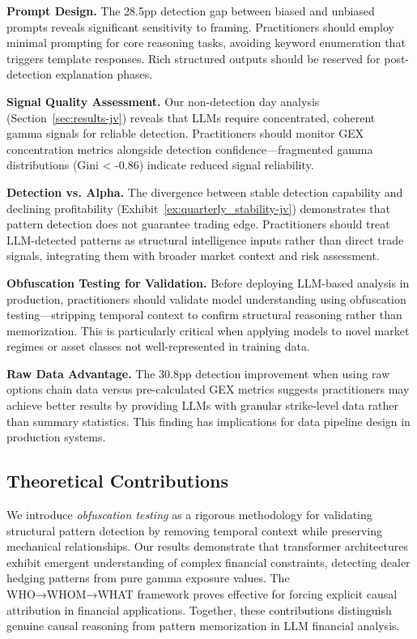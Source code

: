 \textbf{Prompt Design.} The 28.5pp detection gap between biased and unbiased prompts reveals significant sensitivity to framing. Practitioners should employ minimal prompting for core reasoning tasks, avoiding keyword enumeration that triggers template responses. Rich structured outputs should be reserved for post-detection explanation phases.

\textbf{Signal Quality Assessment.} Our non-detection day analysis (Section~\ref{sec:results-jv}) reveals that LLMs require concentrated, coherent gamma signals for reliable detection. Practitioners should monitor GEX concentration metrics alongside detection confidence—fragmented gamma distributions (Gini < -0.86) indicate reduced signal reliability.

\textbf{Detection vs. Alpha.} The divergence between stable detection capability and declining profitability (Exhibit~\ref{ex:quarterly_stability-jv}) demonstrates that pattern detection does not guarantee trading edge. Practitioners should treat LLM-detected patterns as structural intelligence inputs rather than direct trade signals, integrating them with broader market context and risk assessment.

\textbf{Obfuscation Testing for Validation.} Before deploying LLM-based analysis in production, practitioners should validate model understanding using obfuscation testing—stripping temporal context to confirm structural reasoning rather than memorization. This is particularly critical when applying models to novel market regimes or asset classes not well-represented in training data.

\textbf{Raw Data Advantage.} The 30.8pp detection improvement when using raw options chain data versus pre-calculated GEX metrics suggests practitioners may achieve better results by providing LLMs with granular strike-level data rather than summary statistics. This finding has implications for data pipeline design in production systems.

\subsection{Theoretical Contributions}

We introduce \textit{obfuscation testing} as a rigorous methodology for validating structural pattern detection by removing temporal context while preserving mechanical relationships. Our results demonstrate that transformer architectures exhibit emergent understanding of complex financial constraints, detecting dealer hedging patterns from pure gamma exposure values. The WHO→WHOM→WHAT framework proves effective for forcing explicit causal attribution in financial applications. Together, these contributions distinguish genuine causal reasoning from pattern memorization in LLM financial analysis.

